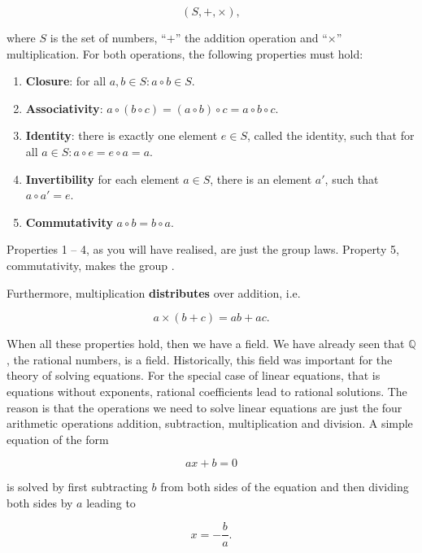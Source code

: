 \documentclass[tikz]{scrreprt}
\begin{document}
\[
(S,+,\times),
\]

where $S$ is the set of numbers, ``$+$'' the addition
operation and ``$\times$'' multiplication.
For both operations, the following properties must hold: 

\begin{enumerate}
\item \textbf{Closure}: 
      for all $a,b \in S: a \circ b \in S$.
      
\item \textbf{Associativity}:
      $a \circ (b \circ c) = (a \circ b) \circ c = a \circ b \circ c$.

\item \textbf{Identity}:
      there is exactly one element $e \in S$, called the identity, such that
      for all $a \in S: a \circ e = e \circ a = a$.

\item \textbf{Invertibility}
      for each element $a \in S$, there is an element $a'$,
      such that $a \circ a' = e$.
      
\item \textbf{Commutativity}
      $a \circ b = b \circ a$.
\end{enumerate}

Properties 1 -- 4, as you will have realised, are just the group laws.
Property 5, commutativity, makes the group .

Furthermore, multiplication \textbf{distributes} over addition, i.e.

\[
a \times (b + c) = ab + ac.
\]

When all these properties hold, then we have a field.
We have already seen that $\mathbb{Q}$, the rational numbers,
is a field. Historically, this field was important for
the theory of solving equations. For the special case of
linear equations, that is equations without exponents,
rational coefficients lead to rational solutions. The reason is
that the operations we need to solve linear equations are
just the four arithmetic operations addition, subtraction,
multiplication and division. A simple equation of the form

\begin{equation}
ax + b = 0
\end{equation}

is solved by first subtracting $b$ from both sides of the equation
and then dividing both sides by $a$ leading to

\begin{equation}
x = -\frac{b}{a}.
\end{equation}
\end{document}
